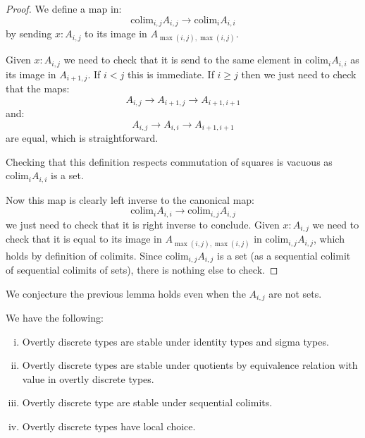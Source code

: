 \begin{proof}
We define a map in:
\[\mathrm{colim}_{i,j} A_{i,j} \to \mathrm{colim}_iA_{i,i}\]
by sending $x:A_{i,j}$ to its image in $A_{\max(i,j),\max(i,j)}$.

Given $x:A_{i,j}$ we need to check that it is send to the same element in $\mathrm{colim}_iA_{i,i}$ as its image in $A_{i+1,j}$. If $i<j$ this is immediate. If $i\geq j$ then we just need to check that the maps:
\[A_{i,j} \to A_{i+1,j} \to A_{i+1,i+1}\]
and:
\[A_{i,j}\to A_{i,i}\to A_{i+1,i+1}\]
are equal, which is straightforward.

Checking that this definition respects commutation of squares is vacuous as $\mathrm{colim}_iA_{i,i}$ is a set.

Now this map is clearly left inverse to the canonical map:
\[ \mathrm{colim}_iA_{i,i}\to\mathrm{colim}_{i,j} A_{i,j} \]
we just need to check that it is right inverse to conclude. Given $x:A_{i,j}$ we need to check that it is equal to its image in $A_{\max(i,j),\max(i,j)}$ in $\mathrm{colim}_{i,j} A_{i,j}$, which holds by definition of colimits. Since $\mathrm{colim}_{i,j} A_{i,j}$ is a set (as a sequential colimit of sequential colimits of sets), there is nothing else to check.
\end{proof}

\begin{remark}
We conjecture the previous lemma holds even when the $A_{i,j}$ are not sets.
\end{remark}

\begin{theorem}
We have the following:
\begin{enumerate}[(i)]
\item Overtly discrete types are stable under identity types and sigma types.
\item Overtly discrete types are stable under quotients by equivalence relation with value in overtly discrete types.
\item Overtly discrete type are stable under sequential colimits.
\item Overtly discrete types have local choice.
\end{enumerate}
\end{theorem}

